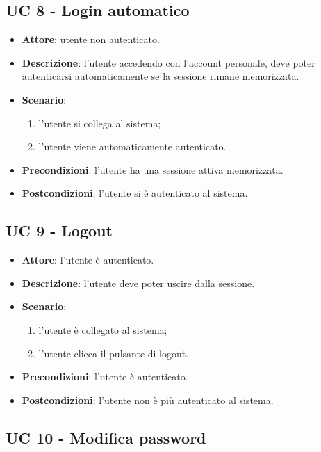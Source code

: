 \subsection{UC 8 - Login automatico}
\begin{itemize}
    \item \textbf{Attore}: utente non autenticato.
    \item \textbf{Descrizione}: l'utente accedendo con l'account personale, deve poter autenticarsi automaticamente se la sessione rimane memorizzata.
    \item \textbf{Scenario}:
    \begin{enumerate}
        \item l'utente si collega al sistema;
        \item l'utente viene automaticamente autenticato.
    \end{enumerate}

    \item \textbf{Precondizioni}: l'utente ha una sessione attiva memorizzata.
    \item \textbf{Postcondizioni}: l'utente si è autenticato al sistema.
\end{itemize}

\subsection{UC 9 - Logout}
\begin{itemize}
    \item \textbf{Attore}: l'utente è autenticato.
    \item \textbf{Descrizione}: l'utente deve poter uscire dalla sessione.
    \item \textbf{Scenario}:
    \begin{enumerate}
        \item l'utente è collegato al sistema;
        \item l'utente clicca il pulsante di logout.
    \end{enumerate}

    \item \textbf{Precondizioni}: l'utente è autenticato.
    \item \textbf{Postcondizioni}: l'utente non è più autenticato al sistema.
\end{itemize}

\subsection{UC 10 - Modifica password}

